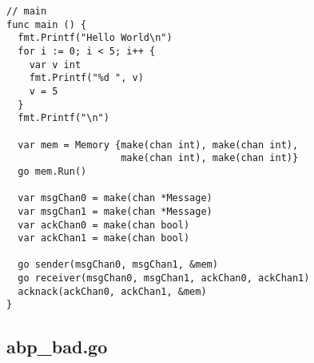 \begin{verbatim}
// main
func main () {
  fmt.Printf("Hello World\n")
  for i := 0; i < 5; i++ {
    var v int
    fmt.Printf("%d ", v)
    v = 5
  }
  fmt.Printf("\n")

  var mem = Memory {make(chan int), make(chan int),
                    make(chan int), make(chan int)}
  go mem.Run()

  var msgChan0 = make(chan *Message)
  var msgChan1 = make(chan *Message)
  var ackChan0 = make(chan bool)
  var ackChan1 = make(chan bool)

  go sender(msgChan0, msgChan1, &mem)
  go receiver(msgChan0, msgChan1, ackChan0, ackChan1)
  acknack(ackChan0, ackChan1, &mem)
}
\end{verbatim}

\subsection{abp\_bad.go}\label{sec:bad-abp-prog}

